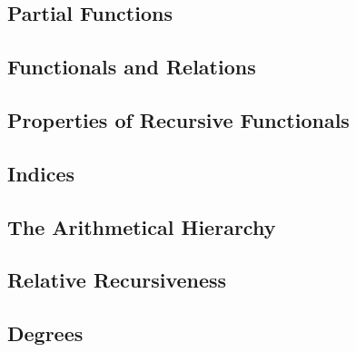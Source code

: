 \subsection{Partial Functions}


\subsection{Functionals and Relations}


\subsection{Properties of Recursive Functionals}


\subsection{Indices}


\subsection{The Arithmetical Hierarchy}


\subsection{Relative Recursiveness}


\subsection{Degrees}

